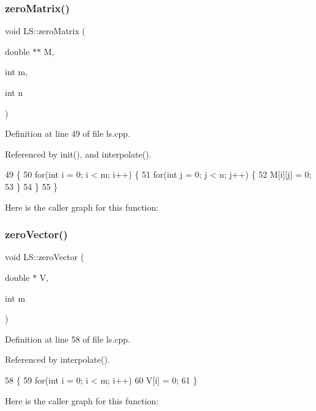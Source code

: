 \subsubsection{\texorpdfstring{zero\+Matrix()}{zeroMatrix()}}
{\footnotesize\ttfamily void L\+S\+::zero\+Matrix (\begin{DoxyParamCaption}\item[{double $\ast$$\ast$}]{M,  }\item[{int}]{m,  }\item[{int}]{n }\end{DoxyParamCaption})\hspace{0.3cm}{\ttfamily [private]}}



Definition at line 49 of file ls.\+cpp.



Referenced by init(), and interpolate().


\begin{DoxyCode}
49                                              \{
50     \textcolor{keywordflow}{for}(\textcolor{keywordtype}{int} i = 0; i < m; i++) \{
51         \textcolor{keywordflow}{for}(\textcolor{keywordtype}{int} j = 0; j < n; j++) \{
52             M[i][j] = 0;
53         \}
54     \}
55 \}
\end{DoxyCode}
Here is the caller graph for this function\+:
\mbox{\label{class_l_s_ae18a77376f05437d3072e7ad56d580cd}} 
\subsubsection{\texorpdfstring{zero\+Vector()}{zeroVector()}}
{\footnotesize\ttfamily void L\+S\+::zero\+Vector (\begin{DoxyParamCaption}\item[{double $\ast$}]{V,  }\item[{int}]{m }\end{DoxyParamCaption})\hspace{0.3cm}{\ttfamily [private]}}



Definition at line 58 of file ls.\+cpp.



Referenced by interpolate().


\begin{DoxyCode}
58                                      \{
59     \textcolor{keywordflow}{for}(\textcolor{keywordtype}{int} i = 0; i < m; i++)
60         V[i] = 0;
61 \}
\end{DoxyCode}
Here is the caller graph for this function\+:


